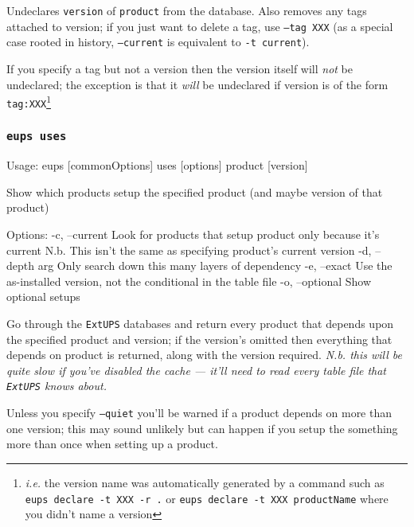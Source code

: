\documentclass{article}
\newcommand{\code}[1]{\texttt{#1}}
\newcommand{\eups}{\code{ExtUPS}\xspace}
\let\overbatim=\verbatim
\let\oendverbatim=\endverbatim
\renewenvironment{verbatim}
{\center\minipage{16cm}\overbatim}
{\oendverbatim\endminipage\endcenter}
\begin{document}
Undeclares \code{version} of \code{product} from the database. Also removes any tags attached to version; if
you just want to delete a tag, use \code{--tag XXX} (as a special case rooted in history, \code{--current} is
equivalent to \code{-t current}).

If you specify a tag but not a version then the version itself will \textit{not} be undeclared; the exception
is that it \textit{will} be undeclared if version is of the form \code{tag:XXX}\footnote{
  \textit{i.e.} the version name was automatically
generated by a command such as  \code{eups declare -t XXX -r .} or \code{eups declare -t XXX productName} where you didn't name a version}


\subsubsection{\code{eups uses}}
\begin{verbatim}
Usage:
    eups [commonOptions] uses [options] product [version]

Show which products setup the specified product (and maybe version of that product)

Options:
   -c, --current           Look for products that setup product only because it's current
                           N.b. This isn't the same as specifying product's current version
   -d, --depth      arg    Only search down this many layers of dependency
   -e, --exact             Use the as-installed version, not the conditional in the table file
   -o, --optional          Show optional setups
\end{verbatim}

Go through the \eups databases and return every product that depends upon the specified product and version;
if the version's omitted then everything that depends on product is returned, along with the version
required. \textit{N.b.  this will be quite slow if you've disabled the cache --- it'll need to read every table
  file that \eups knows about.}

Unless you specify \code{--quiet} you'll be warned if a product depends on
more than one version;  this may sound unlikely but can happen if you setup
the something more than once when setting up a product.

\end{document}
